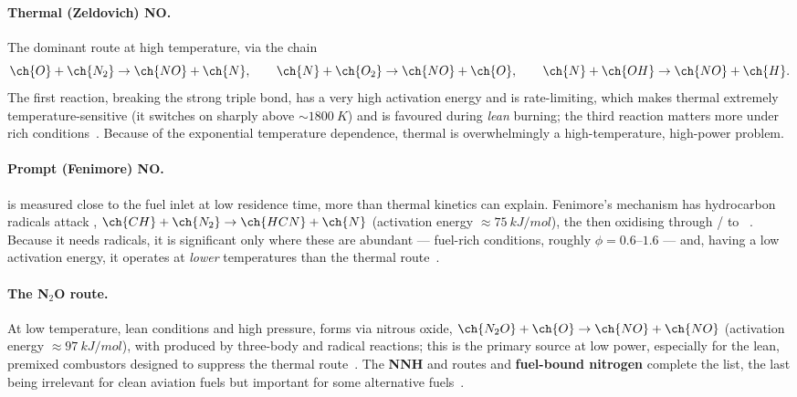 \paragraph{Thermal (Zeldovich) NO.} The dominant route at high temperature, via the chain
\begin{equation}
\ch{O}+\ch{N_2}\rightarrow\ch{NO}+\ch{N},\qquad
\ch{N}+\ch{O_2}\rightarrow\ch{NO}+\ch{O},\qquad
\ch{N}+\ch{OH}\rightarrow\ch{NO}+\ch{H}.
\label{eq:zeldovich}
\end{equation}
The first reaction, breaking the strong  triple bond, has a very high activation energy and is rate-limiting, which makes thermal  extremely temperature-sensitive (it switches on sharply above $\sim\SI{1800}{K}$) and is favoured during \emph{lean} burning; the third reaction matters more under rich conditions~\cite{lecture13,warnatz2006combustion}. Because of the exponential temperature dependence, thermal  is overwhelmingly a high-temperature, high-power problem.

\paragraph{Prompt (Fenimore) NO.}  is measured close to the fuel inlet at low residence time, more than thermal kinetics can explain. Fenimore's mechanism has hydrocarbon radicals attack , $\ch{CH}+\ch{N_2}\rightarrow\ch{HCN}+\ch{N}$ (activation energy $\approx\SI{75}{kJ/mol}$), the  then oxidising through / to ~\cite{lecture13}. Because it needs  radicals, it is significant only where these are abundant --- fuel-rich conditions, roughly $\phi=0.6$--$1.6$ --- and, having a low activation energy, it operates at \emph{lower} temperatures than the thermal route~\cite{lecture13}.

\paragraph{The N$_2$O route.} At low temperature, lean conditions and high pressure,  forms via nitrous oxide, $\ch{N_2O}+\ch{O}\rightarrow\ch{NO}+\ch{NO}$ (activation energy $\approx\SI{97}{kJ/mol}$), with  produced by three-body and radical reactions; this is the primary source at low power, especially for the lean, premixed combustors designed to suppress the thermal route~\cite{lecture13}. The \textbf{NNH} and \textbf{} routes and \textbf{fuel-bound nitrogen} complete the list, the last being irrelevant for clean aviation fuels but important for some alternative fuels~\cite{lecture13}.

